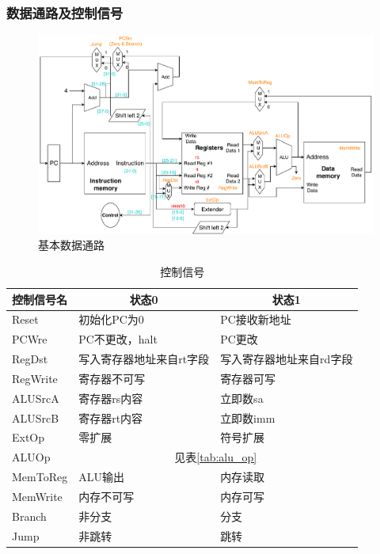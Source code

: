 \subsubsection{数据通路及控制信号}
\begin{figure}[htbp]
\centering
\includegraphics[width=\linewidth]{fig/Datapath.pdf}
\caption{基本数据通路}
\label{fig:datapath}
\end{figure}
\begin{table}[htbp]
  \centering\xiaowu
  \caption{控制信号}
    \begin{tabular}{|l|l|l|}
    \hline
    \multicolumn{1}{|c|}{控制信号名} & \multicolumn{1}{c|}{状态0} & \multicolumn{1}{c|}{状态1} \bigstrut\\
    \hline
    Reset & 初始化PC为0 & PC接收新地址 \bigstrut\\
    \hline
    PCWre & PC不更改，halt & PC更改 \bigstrut\\
    \hline
    RegDst & 写入寄存器地址来自rt字段 & 写入寄存器地址来自rd字段 \bigstrut\\
    \hline
    RegWrite & 寄存器不可写 & 寄存器可写 \bigstrut\\
    \hline
    ALUSrcA & 寄存器rs内容 & 立即数sa \bigstrut\\
    \hline
    ALUSrcB & 寄存器rt内容 & 立即数imm \bigstrut\\
    \hline
    ExtOp & 零扩展   & 符号扩展 \bigstrut\\
    \hline
    ALUOp & \multicolumn{2}{c|}{见表\ref{tab:alu_op}} \bigstrut\\
    \hline
    MemToReg & ALU输出 & 内存读取 \bigstrut\\
    \hline
    MemWrite & 内存不可写 & 内存可写 \bigstrut\\
    \hline
    Branch & 非分支   & 分支 \bigstrut\\
    \hline
    Jump  & 非跳转   & 跳转 \bigstrut\\
    \hline
    \end{tabular}%
  \label{tab:control}%
\end{table}%

